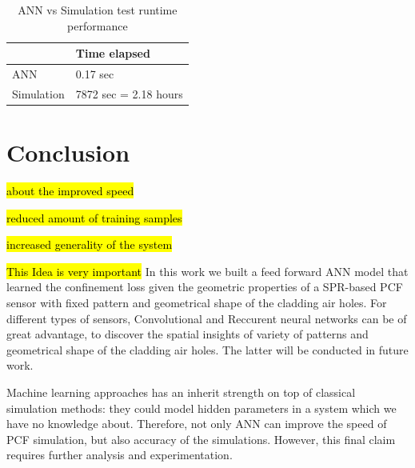 \documentclass[draft, a4, 10pt, onecolumn]{IEEEtran}
\begin{document}
\begin{table}[h]
\centering
\begin{tabular}{l|l}
      & Time elapsed \\
      \hline
    ANN &  0.17 sec \\
    \hline
    Simulation &  7872 sec = 2.18 hours  \\
\end{tabular}

\caption{ANN vs Simulation test runtime performance}
\end{table}
\newpage

\section{Conclusion}
\label{sec:conc}

\hl{about the improved speed}

\hl{reduced amount of training samples}

\hl{increased generality of the system}

\hl{This Idea is very important}
In this work we built a feed forward ANN model that learned the confinement loss given the geometric properties of a SPR-based PCF sensor with fixed pattern and geometrical shape of the cladding air holes. For different types of sensors, Convolutional and Reccurent neural networks can be of great advantage, to discover the spatial insights of variety of patterns and  geometrical shape of the cladding air holes. The latter will be conducted in future work.

Machine learning approaches has an inherit strength on top of classical simulation methods: they could model hidden parameters in a system which we have no knowledge about. Therefore, not only ANN can improve the speed of PCF simulation, but also accuracy of the simulations. However, this final claim requires further analysis and experimentation.
	
\end{document}
